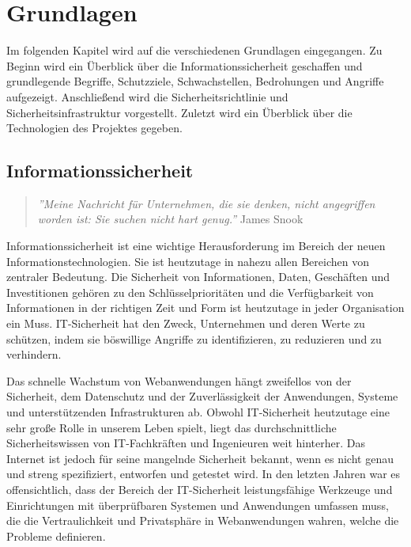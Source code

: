 \chapter{Grundlagen}
\label{chap:k2}

Im folgenden Kapitel wird auf die verschiedenen Grundlagen eingegangen. Zu Beginn wird ein Überblick über die Informationssicherheit geschaffen und grundlegende Begriffe, Schutzziele, Schwachstellen, Bedrohungen und Angriffe aufgezeigt. Anschließend wird die Sicherheitsrichtlinie und Sicherheitsinfrastruktur vorgestellt. Zuletzt wird ein Überblick über die Technologien des Projektes gegeben.

\section{Informationssicherheit}

\begin{quote}
	\emph{''Meine Nachricht für Unternehmen, die sie denken, nicht angegriffen worden ist: Sie suchen nicht hart genug.''}
	\hfill James Snook
\end{quote}

Informationssicherheit ist eine wichtige Herausforderung im Bereich der neuen Informationstechnologien. Sie ist heutzutage in nahezu allen Bereichen von zentraler Bedeutung.  Die Sicherheit von Informationen, Daten, Geschäften und Investitionen gehören zu den Schlüsselprioritäten und die Verfügbarkeit von Informationen in der richtigen Zeit und Form ist heutzutage in jeder Organisation ein Muss. IT-Sicherheit hat den Zweck, Unternehmen und deren Werte zu schützen, indem sie böswillige Angriffe zu identifizieren, zu reduzieren und zu verhindern.

Das schnelle Wachstum von Webanwendungen hängt zweifellos von der Sicherheit, dem Datenschutz und der Zuverlässigkeit der Anwendungen, Systeme und unterstützenden Infrastrukturen ab. Obwohl IT-Sicherheit heutzutage eine sehr große Rolle in unserem Leben spielt, liegt das durchschnittliche Sicherheitswissen von IT-Fachkräften und Ingenieuren weit hinterher. Das Internet ist jedoch für seine mangelnde Sicherheit bekannt, wenn es nicht genau und streng spezifiziert, entworfen und getestet wird. In den letzten Jahren war es offensichtlich, dass der Bereich der IT-Sicherheit leistungsfähige Werkzeuge und Einrichtungen mit überprüfbaren Systemen und Anwendungen umfassen muss, die die Vertraulichkeit und Privatsphäre in Webanwendungen wahren, welche die Probleme definieren\cite[1]{furnell2008securing}.


